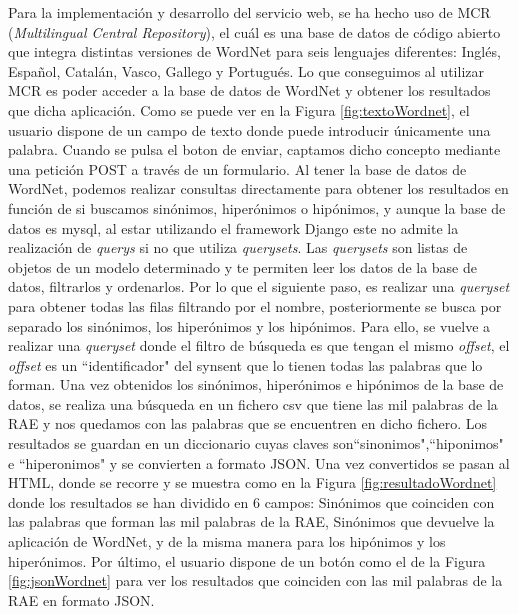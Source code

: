 Para la implementación y desarrollo del servicio web, se ha hecho uso de MCR (\textit{Multilingual Central Repository}), el cuál es una base de datos de código abierto que integra distintas versiones de WordNet para seis lenguajes diferentes: Inglés, Español, Catalán, Vasco, Gallego y Portugués. 
Lo que conseguimos al utilizar MCR es poder acceder a la base de datos de WordNet y obtener los resultados que dicha aplicación.
Como se puede ver en la Figura \ref{fig:textoWordnet}, el usuario dispone de un campo de texto donde puede introducir únicamente una palabra. Cuando se pulsa el boton de enviar, captamos dicho concepto mediante una petición POST a través de un formulario.
Al tener la base de datos de WordNet, podemos realizar consultas directamente para obtener los resultados en función de si buscamos sinónimos, hiperónimos o hipónimos, y aunque la base de datos es mysql, al estar utilizando el framework Django este no admite la realización de \textit{querys} si no que utiliza \textit{querysets}.  Las \textit{querysets} son listas de objetos de un modelo determinado y te permiten leer los datos de la base de datos, filtrarlos y ordenarlos.
Por lo que el siguiente paso, es realizar una \textit{queryset} para obtener todas las filas filtrando por el nombre, posteriormente se busca por separado los sinónimos, los hiperónimos y los hipónimos. Para ello, se vuelve a realizar una \textit{queryset} donde el filtro de búsqueda es que tengan el mismo \textit{offset}, el \textit{offset} es un ``identificador" del synsent que lo tienen todas las palabras que lo forman.
Una vez obtenidos los sinónimos, hiperónimos e hipónimos de la base de datos, se realiza una búsqueda en un fichero csv que tiene las mil palabras de la RAE y nos quedamos con las palabras que se encuentren en dicho fichero.
Los resultados se guardan en un diccionario cuyas claves son``sinonimos",``hiponimos" e ``hiperonimos" y se convierten a formato JSON. Una vez convertidos se pasan al HTML, donde se recorre y se muestra como en la Figura \ref{fig:resultadoWordnet} donde los resultados se han dividido en 6 campos: Sinónimos que coinciden con las palabras que forman las mil palabras de la RAE, Sinónimos que devuelve la aplicación de WordNet, y de la misma manera para los hipónimos y los hiperónimos.
Por último, el usuario dispone de un botón como el de la Figura \ref{fig:jsonWordnet} para ver los resultados que coinciden con las mil palabras de la RAE en formato JSON.
